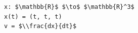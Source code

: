 \documentclass[border=10pt]{standalone}
\begin{document}
\begin{lstlisting}
x: $\mathbb{R}$ $\to$ $\mathbb{R}^3$
x(t) = (t, t, t)
v = $\\frac{dx}{dt}$
\end{lstlisting}
\end{document}

